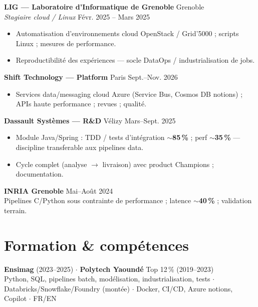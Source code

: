\documentclass[10pt,a4paper]{article}
\begin{document}
\textbf{LIG --- Laboratoire d'Informatique de Grenoble} \hfill Grenoble\\
\textit{Stagiaire cloud / Linux} \hfill F\'evr. 2025 -- Mars 2025
\begin{itemize}
  \item Automatisation d'environnements cloud OpenStack / Grid'5000 ; scripts Linux ; mesures de performance.
  \item Reproductibilit\'e des exp\'eriences --- socle DataOps / industrialisation de jobs.
\end{itemize}

\textbf{Shift Technology --- Platform} \hfill Paris \hfill Sept.--Nov. 2026
\begin{itemize}
  \item Services data/messaging cloud Azure (Service Bus, Cosmos DB notions) ; APIs haute performance ; revues ; qualit\'e.
\end{itemize}

\textbf{Dassault Syst\`emes --- R\&D} \hfill V\'elizy \hfill Mars--Sept. 2025
\begin{itemize}
  \item Module Java/Spring : TDD / tests d'int\'egration $\sim$\textbf{85\,\%} ; perf $\sim$\textbf{35\,\%} --- discipline transferable aux pipelines data.
  \item Cycle complet (analyse $\rightarrow$ livraison) avec product Champions ; documentation.
\end{itemize}

\textbf{INRIA Grenoble} \hfill Mai--Ao\^ut 2024\\
Pipelines C/Python sous contrainte de performance ; latence $\sim$\textbf{40\,\%} ; validation terrain.

\section{Formation \& comp\'etences}
\textbf{Ensimag} (2023--2025) $\cdot$ \textbf{Polytech Yaound\'e} Top 12\,\% (2019--2023)\\
Python, SQL, pipelines batch, mod\'elisation, industrialisation, tests $\cdot$ Databricks/Snowflake/Foundry (mont\'ee) $\cdot$ Docker, CI/CD, Azure notions, Copilot $\cdot$ FR/EN
\end{document}
